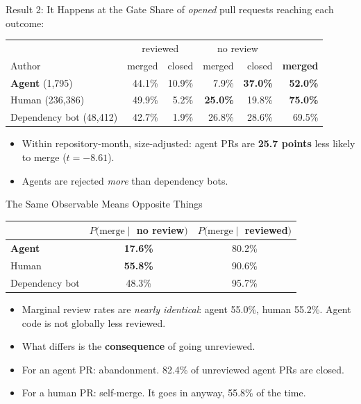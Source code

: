 \begin{frame}{Result 2: It Happens at the Gate}
Share of \emph{opened} pull requests reaching each outcome:
\begin{center}\small
\begin{tabular}{lrrrrr}
\toprule
 & \multicolumn{2}{c}{reviewed} & \multicolumn{2}{c}{no review} & \\
Author & merged & closed & merged & closed & \textbf{merged}\\
\midrule
\textbf{Agent} (1,795) & 44.1\% & 10.9\% & 7.9\% & \textbf{37.0\%} & \textbf{52.0\%}\\
Human (236,386) & 49.9\% & 5.2\% & \textbf{25.0\%} & 19.8\% & \textbf{75.0\%}\\
Dependency bot (48,412) & 42.7\% & 1.9\% & 26.8\% & 28.6\% & 69.5\%\\
\bottomrule
\end{tabular}
\end{center}
\vfill
\begin{itemize}\small
  \item Within repository-month, size-adjusted: agent PRs are
        \textbf{25.7 points} less likely to merge ($t=-8.61$).
  \item Agents are rejected \emph{more} than dependency bots.
\end{itemize}
\end{frame}

\begin{frame}{The Same Observable Means Opposite Things}
\begin{center}\large
\begin{tabular}{lcc}
\toprule
 & $P(\text{merge} \mid$ \textbf{no} review$)$ & $P(\text{merge} \mid$ reviewed$)$\\
\midrule
\textbf{Agent} & \textbf{17.6\%} & 80.2\%\\
Human & \textbf{55.8\%} & 90.6\%\\
Dependency bot & 48.3\% & 95.7\%\\
\bottomrule
\end{tabular}
\end{center}
\vfill
\begin{itemize}
  \item Marginal review rates are \emph{nearly identical}:
        agent 55.0\%, human 55.2\%. Agent code is not globally less reviewed.
  \item What differs is the \textbf{consequence} of going unreviewed.
  \item For an agent PR: abandonment. 82.4\% of unreviewed agent PRs are closed.
  \item For a human PR: self-merge. It goes in anyway, 55.8\% of the time.
\end{itemize}
\end{frame}

